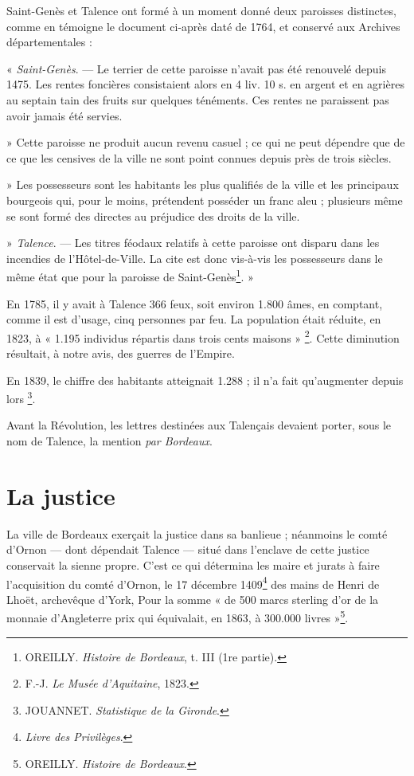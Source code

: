 Saint-Genès et Talence ont formé à un moment donné deux paroisses distinctes, comme en témoigne le document ci-après daté de 1764, et conservé aux Archives départementales : 

« \textit{Saint-Genès}. — Le terrier de cette paroisse n'avait pas été renouvelé depuis 1475. Les rentes foncières consistaient alors en 4 liv. 10 s. en argent et en agrières au septain tain des fruits sur quelques ténéments. Ces rentes ne paraissent pas avoir jamais été servies. 

» Cette paroisse ne produit aucun revenu casuel ; ce qui ne peut dépendre que de ce que les censives de la ville ne sont point connues depuis près de trois siècles.

» Les possesseurs sont les habitants les plus qualifiés de la ville et les principaux bourgeois qui, pour le moins, prétendent posséder un franc aleu ; plusieurs même se sont formé des directes au préjudice des droits de la ville.

» \textit{Talence}. — Les titres féodaux relatifs à cette paroisse ont disparu dans les incendies de l'Hôtel-de-Ville. La cite est donc vis-à-vis les possesseurs dans le même état que pour la paroisse de Saint-Genès\footnote{OREILLY. \textit{Histoire de Bordeaux}, t. III (1re partie).}. »

En 1785, il y avait à Talence 366 feux, soit environ 1.800 âmes, en comptant, comme il est d'usage, cinq personnes par feu. La population était réduite, en 1823, à « 1.195 individus répartis dans trois cents maisons » \footnote{F.-J. \textit{Le Musée d'Aquitaine}, 1823.}. Cette diminution résultait, à notre avis, des guerres de l'Empire. 

En 1839, le chiffre des habitants atteignait 1.288 ; il n'a fait qu'augmenter depuis lors \footnote{JOUANNET. \textit{Statistique de la Gironde}.}. 

Avant la Révolution, les lettres destinées aux Talençais devaient porter, sous le nom de Talence, la mention \textit{par Bordeaux}. 


\section{La justice}

La ville de Bordeaux exerçait la justice dans sa banlieue ; néanmoins le comté d'Ornon — dont dépendait Talence — situé dans l'enclave de cette justice conservait la sienne propre. C'est ce qui détermina les maire et jurats à faire l'acquisition du comté d'Ornon, le 17 décembre 1409\footnote{\textit{Livre des Privilèges}.} des mains de Henri de Lhoët, archevêque d'York, Pour la somme « de 500 marcs sterling d'or de la monnaie d'Angleterre prix qui équivalait, en 1863, à 300.000 livres »\footnote{OREILLY. \textit{Histoire de Bordeaux}.}.

